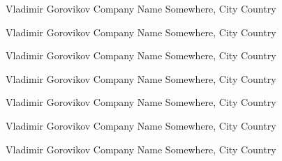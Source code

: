 \documentclass{article}%
\begin{document}
%
\normalsize%
\pagestyle{empty}%
\begin{minipage}{0.5\textwidth}%
Vladimir Gorovikov%
\newline%
%
Company Name%
\newline%
%
Somewhere, City%
\newline%
%
Country%
\end{minipage}%
\begin{minipage}{0.5\textwidth}%
Vladimir Gorovikov%
\newline%
%
Company Name%
\newline%
%
Somewhere, City%
\newline%
%
Country%
\end{minipage}%
\vspace*{20pt}%
\linebreak%
\begin{minipage}{0.5\textwidth}%
Vladimir Gorovikov%
\newline%
%
Company Name%
\newline%
%
Somewhere, City%
\newline%
%
Country%
\end{minipage}%
\begin{minipage}{0.5\textwidth}%
Vladimir Gorovikov%
\newline%
%
Company Name%
\newline%
%
Somewhere, City%
\newline%
%
Country%
\end{minipage}%
\vspace*{20pt}%
\linebreak%
\begin{minipage}{0.5\textwidth}%
Vladimir Gorovikov%
\newline%
%
Company Name%
\newline%
%
Somewhere, City%
\newline%
%
Country%
\end{minipage}%
\begin{minipage}{0.5\textwidth}%
Vladimir Gorovikov%
\newline%
%
Company Name%
\newline%
%
Somewhere, City%
\newline%
%
Country%
\end{minipage}%
\vspace*{20pt}%
\linebreak%
\begin{minipage}{0.5\textwidth}%
Vladimir Gorovikov%
\newline%
%
Company Name%
\newline%
%
Somewhere, City%
\newline%
%
Country%
\end{minipage}%
\end{document}
